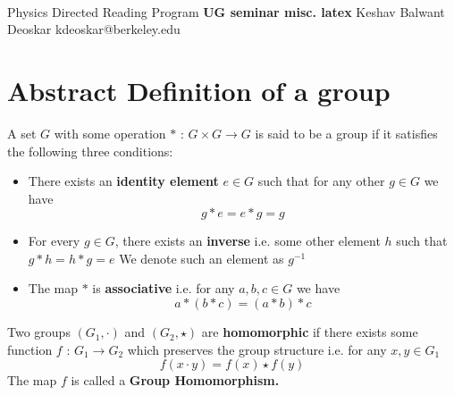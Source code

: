 \documentclass[11pt]{article}
\begin{document}
\thispagestyle{empty}
\bigskip \
\vspace{0.1cm}

\begin{center}
{\fontsize{22}{22} \selectfont Physics Directed Reading Program}
\vskip 16pt
{\fontsize{36}{36} \selectfont \bf \sffamily UG seminar misc. latex}
\vskip 24pt
{\fontsize{18}{18} \selectfont \rmfamily Keshav Balwant Deoskar} 
\vskip 6pt
{\fontsize{14}{14} \selectfont \ttfamily kdeoskar@berkeley.edu} 
\vskip 24pt
\end{center}


\newpage

\section{Abstract Definition of a group}

\begin{bluebox}
    \begin{definition}
        A set $G$ with some operation $* \text{ : } G \times G \rightarrow G$ is said to be a group if it satisfies the following three conditions:
        \begin{itemize}
            \item There exists an \textbf{identity element} $e \in G$ such that for any other $g \in G$ we have $$ g * e = e * g = g $$
            \item For every $g \in G$, there exists an \textbf{inverse} i.e. some other element $h$ such that $g * h = h * g = e$ We denote such an element as $g^{-1}$
            \item The map $*$ is \textbf{associative} i.e. for any $a,b,c \in G$ we have $$ a * (b*c) = (a*b)*c $$ 
        \end{itemize}
    \end{definition}
\end{bluebox}


\begin{bluebox}
    \begin{definition}
        Two groups $(G_1, \cdot)$ and $(G_2, \star)$ are \textbf{homomorphic} if there exists some function $f \text{ : } G_1 \rightarrow G_2$ which preserves the group structure i.e. for any $x, y \in G_1$
        $$ f(x \cdot y) = f(x) \star f(y) $$ The map $f$ is called a \textbf{Group Homomorphism.}
    \end{definition}
\end{bluebox}
\end{document}
